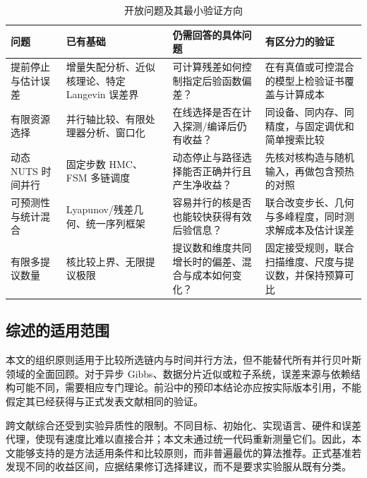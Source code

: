 \documentclass[UTF8,a4paper,zihao=-4,fontset=fandol]{ctexart}
\begin{document}
\begin{table}[htbp]
\centering{}
\caption{开放问题及其最小验证方向}\label{tab:4}
\begin{tabular}{@{}>{\raggedright\arraybackslash}p{}>{\raggedright\arraybackslash}p{}>{\raggedright\arraybackslash}p{}>{\raggedright\arraybackslash}p{}@{}}
\toprule
问题 & 已有基础 & 仍需回答的具体问题 & 有区分力的验证 \\
\midrule
提前停止与估计误差 & 增量失配分析、近似核理论、特定 Langevin 误差界 & 可计算残差如何控制指定后验函数偏差？ & 在有真值或可控混合的模型上检验证书覆盖与计算成本 \\[4pt]
有限资源选择 & 并行轴比较、有限处理器分析、窗口化 & 在线选择是否在计入探测/编译后仍有收益？ & 同设备、同内存、同精度，与固定调优和简单搜索比较 \\[4pt]
动态 NUTS 时间并行 & 固定步数 HMC、FSM 多链调度 & 动态停止与路径选择能否正确并行且产生净收益？ & 先核对核构造与随机输入，再做包含预热的对照 \\[4pt]
可预测性与统计混合 & Lyapunov/残差几何、统一序列框架 & 容易并行的核是否也能较快获得有效后验信息？ & 联合改变步长、几何与多峰程度，同时测求解成本及估计误差 \\[4pt]
有限多提议数量 & 核比较上界、无限提议极限 & 提议数和维度共同增长时的偏差、混合与成本如何变化？ & 固定接受规则，联合扫描维度、尺度与提议数，并保持预算可比 \\[4pt]
\bottomrule
\end{tabular}
\end{table}

\subsection{综述的适用范围}

本文的组织原则适用于比较所选链内与时间并行方法，但不能替代所有并行贝叶斯领域的全面回顾。对于异步 Gibbs、数据分片近似或粒子系统，误差来源与依赖结构可能不同，需要相应专门理论。前沿中的预印本结论亦应按实际版本引用，不能假定其已经获得与正式发表文献相同的验证。

跨文献综合还受到实验异质性的限制。不同目标、初始化、实现语言、硬件和误差代理，使现有速度比难以直接合并；本文未通过统一代码重新测量它们。因此，本文能够支持的是方法适用条件和比较原则，而非普遍最优的算法推荐。正式基准若发现不同的收益区间，应据结果修订选择建议，而不是要求实验服从既有分类。
\end{document}
